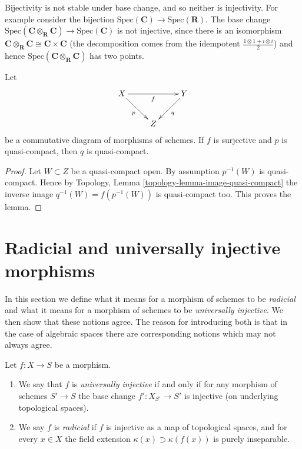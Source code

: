 \begin{example}
\label{example-injective-not-preserved-base-change}
Bijectivity is not stable under base change, and so neither is injectivity.
For example consider the bijection
$\text{Spec}(\mathbf{C}) \to \text{Spec}(\mathbf{R})$.
The base change
$\text{Spec}(\mathbf{C} \otimes_{\mathbf{R}} \mathbf{C}) \to
\text{Spec}(\mathbf{C})$
is not injective, since there is an isomorphism
$\mathbf{C} \otimes_{\mathbf{R}} \mathbf{C} \cong \mathbf{C} \times \mathbf{C}$
(the decomposition comes from the idempotent
$\frac{1 \otimes 1 + i \otimes i}{2}$) and hence
$\text{Spec}(\mathbf{C} \otimes_{\mathbf{R}} \mathbf{C})$ has two points.
\end{example}

\begin{lemma}
\label{lemma-surjection-from-quasi-compact}
Let
$$
\xymatrix{
X \ar[rr]_f \ar[rd]_p & &
Y \ar[dl]^q \\
& Z
}
$$
be a commutative diagram of morphisms of schemes.
If $f$ is surjective and $p$ is quasi-compact, then $q$ is quasi-compact.
\end{lemma}

\begin{proof}
Let $W \subset Z$ be a quasi-compact open. By assumption $p^{-1}(W)$
is quasi-compact. Hence by
Topology, Lemma \ref{topology-lemma-image-quasi-compact}
the inverse image $q^{-1}(W) = f(p^{-1}(W))$ is quasi-compact too.
This proves the lemma.
\end{proof}




\section{Radicial and universally injective morphisms}
\label{section-radicial}

\noindent
In this section we define what it means for a morphism of schemes to
be {\it radicial} and what it means for a morphism of schemes to be
{\it universally injective}. We then show that these notions agree.
The reason for introducing both is that in the case of algebraic spaces
there are corresponding notions which may not always agree.

\begin{definition}
\label{definition-universally-injective}
Let $f : X \to S$ be a morphism.
\begin{enumerate}
\item We say that $f$ is {\it universally injective} if and only
if for any morphism of schemes $S' \to S$ the base change
$f' : X_{S'} \to S'$ is injective (on underlying topological spaces).
\item We say $f$ is {\it radicial} if $f$ is injective as a
map of topological spaces, and for every $x \in X$ the field
extension $\kappa(x) \supset \kappa(f(x))$ is purely inseparable.
\end{enumerate}
\end{definition}

